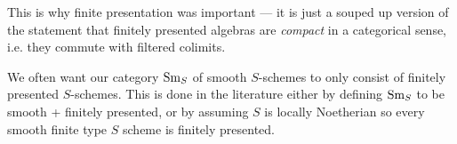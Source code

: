 \documentclass[11pt,openany]{book}
\providecommand{\fp}{\mathrm{fp}}
\providecommand{\qcqs}{\mathrm{qcqs}}
\begin{document}
This is why finite presentation was important --- it is just a souped up version of the statement that finitely presented algebras are \emph{compact} in a categorical sense, i.e. they commute with filtered colimits.

\begin{remark} We often want our category $\mathrm{Sm}_S$ of smooth $S$-schemes to only consist of finitely presented $S$-schemes. This is done in the literature either by defining $\mathrm{Sm}_S$ to be smooth + finitely presented, or by assuming $S$ is locally Noetherian so every smooth finite type $S$ scheme is finitely presented.
\end{remark}


\end{document}
